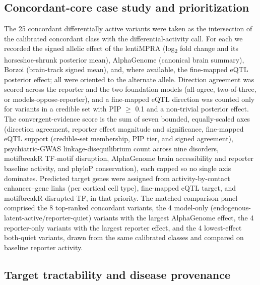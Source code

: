 \documentclass[9pt,twocolumn]{article}
\begin{document}
\subsection{Concordant-core case study and prioritization}

The 25 concordant differentially active variants were taken as the intersection of the calibrated concordant class with the differential-activity call. For each we recorded the signed allelic effect of the lentiMPRA (log\textsubscript{2} fold change and its horseshoe-shrunk posterior mean), AlphaGenome (canonical brain summary), Borzoi (brain-track signed mean), and, where available, the fine-mapped eQTL posterior effect; all were oriented to the alternate allele. Direction agreement was scored across the reporter and the two foundation models (all-agree, two-of-three, or models-oppose-reporter), and a fine-mapped eQTL direction was counted only for variants in a credible set with PIP $\ge$ 0.1 and a non-trivial posterior effect. The convergent-evidence score is the sum of seven bounded, equally-scaled axes (direction agreement, reporter effect magnitude and significance, fine-mapped eQTL support (credible-set membership, PIP tier, and signed agreement), psychiatric-GWAS linkage-disequilibrium count across nine disorders, motifbreakR TF-motif disruption, AlphaGenome brain accessibility and reporter baseline activity, and phyloP conservation), each capped so no single axis dominates. Predicted target genes were assigned from activity-by-contact enhancer--gene links (per cortical cell type), fine-mapped eQTL target, and motifbreakR-disrupted TF, in that priority. The matched comparison panel comprised the 8 top-ranked concordant variants, the 4 model-only (endogenous-latent-active/reporter-quiet) variants with the largest AlphaGenome effect, the 4 reporter-only variants with the largest reporter effect, and the 4 lowest-effect both-quiet variants, drawn from the same calibrated classes and compared on baseline reporter activity.


\subsection{Target tractability and disease provenance}
\end{document}

